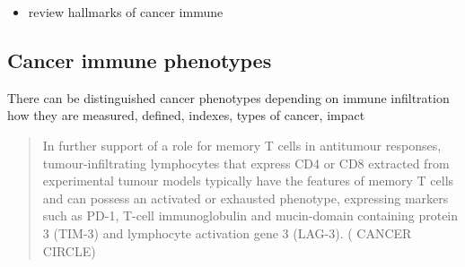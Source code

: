 \documentclass[12pt,]{book}
\providecommand{\tightlist}{%
  \setlength{\itemsep}{0pt}\setlength{\parskip}{0pt}}
\theoremstyle{definition}
\theoremstyle{definition}
\theoremstyle{definition}
\theoremstyle{remark}
\begin{document}
\begin{itemize}
\tightlist
\item
  review hallmarks of cancer immune
\end{itemize}

\hypertarget{cancer-immune-phenotypes}{%
\subsection{Cancer immune phenotypes}\label{cancer-immune-phenotypes}}

There can be distinguished cancer phenotypes depending on immune
infiltration how they are measured, defined, indexes, types of cancer,
impact

\begin{quote}
In further support of a role for memory T cells in antitumour responses,
tumour-infiltrating lymphocytes that express CD4 or CD8 extracted from
experimental tumour models typically have the features of memory T cells
and can possess an activated or exhausted phenotype, expressing markers
such as PD-1, T-cell immunoglobulin and mucin-domain containing protein
3 (TIM-3) and lymphocyte activation gene 3 (LAG-3). (\citet{IMMUNE}
CANCER CIRCLE)
\end{quote}
\end{document}
